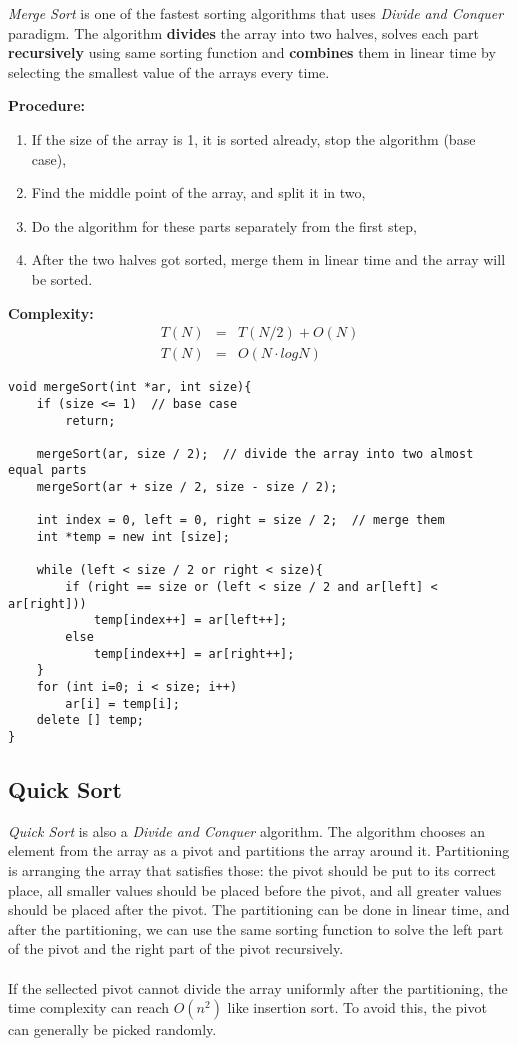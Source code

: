 \documentclass[12pt]{article}
\begin{document}
\textit{Merge Sort} is one of the fastest sorting algorithms that uses \textit{Divide and Conquer} paradigm. The algorithm \textbf{divides} the array into two halves, solves each part \textbf{recursively} using same sorting function and \textbf{combines} them in linear time by selecting the smallest value of the arrays every time.

\textbf{Procedure: }
\begin{enumerate}
	\item If the size of the array is 1, it is sorted already, stop the algorithm (base case),
	\item Find the middle point of the array, and split it in two,
	\item Do the algorithm for these parts separately from the first step,
	\item After the two halves got sorted, merge them in linear time and the array will be sorted. 
\end{enumerate}	

\textbf{Complexity: }
\begin{eqnarray*}
	T(N) &=& T(N / 2) + O(N) \\
	T(N) &=& O(N \cdot logN)
\end{eqnarray*}

\begin{verbatim}
void mergeSort(int *ar, int size){
    if (size <= 1)  // base case
        return;
	
    mergeSort(ar, size / 2);  // divide the array into two almost equal parts
    mergeSort(ar + size / 2, size - size / 2);
	
    int index = 0, left = 0, right = size / 2;  // merge them 
    int *temp = new int [size];
	
    while (left < size / 2 or right < size){
        if (right == size or (left < size / 2 and ar[left] < ar[right]))
            temp[index++] = ar[left++];
        else 
            temp[index++] = ar[right++];
    }
    for (int i=0; i < size; i++)
        ar[i] = temp[i];
    delete [] temp;
}		
\end{verbatim}

\cleardoublepage
    \subsection{Quick Sort}
		
\textit{Quick Sort} is also a \textit{Divide and Conquer} algorithm. The algorithm chooses an element from the array as a pivot and partitions the array around it. Partitioning is arranging the array that satisfies those: the pivot should be put to its correct place, all smaller values should be placed before the pivot, and all greater values should be placed after the pivot. The partitioning can be done in linear time, and after the partitioning, we can use the same sorting function to solve the left part of the pivot and the right part of the pivot recursively. \\ \\
If the sellected pivot cannot divide the array uniformly after the partitioning, the time complexity can reach $O(n ^ 2)$ like insertion sort. To avoid this, the pivot can generally be picked randomly.
\end{document}
